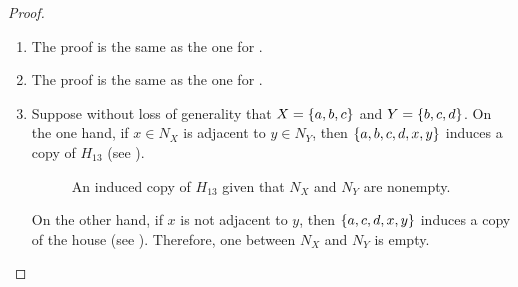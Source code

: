 \begin{proof}
    \leavevmode \par
    \begin{enumerate}[label=(\roman*)]
        \item The proof is the same as the one for .
        \item The proof is the same as the one for .
        \item Suppose without loss of generality that $X=\left\{a,b,c\right\}$ and
            $Y=\left\{b,c,d\right\}$. On the one hand, if $x\in N_X$ is adjacent to $y\in
            N_Y$, then $\left\{a,b,c,d,x,y\right\}$ induces a copy of $H_{13}$ (see
            ).

            \begin{figure}[htb!]
                \centering
                \caption{An induced copy of $H_{13}$ given that $N_X$ and $N_Y$
                    are nonempty.}
                \label{fig:type_5_1}
            \end{figure}
            
            On the other hand, if $x$ is not adjacent to $y$, then
            $\left\{a,c,d,x,y\right\}$ induces a copy of the house (see
            ). Therefore, one between $N_X$ and $N_Y$ is
            empty.

            \begin{figure}[htb!]
                \centering
\end{figure}
\end{enumerate}
\end{proof}
